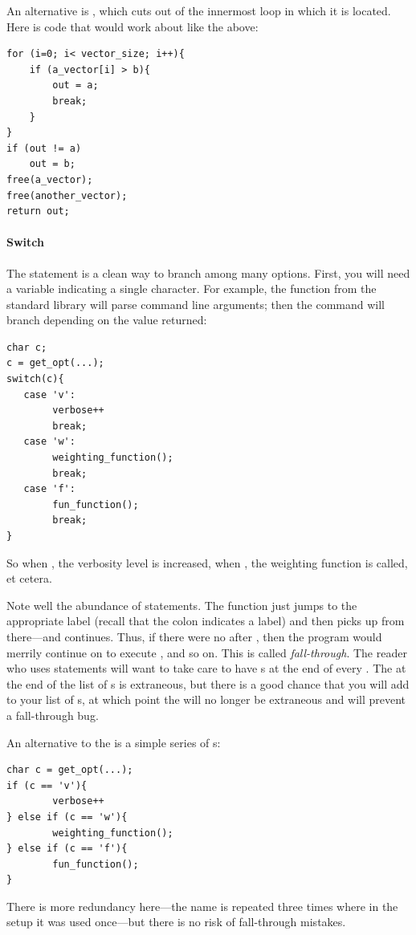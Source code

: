 \documentclass[12pt]{article}
\makeatletter
\def\cind#1{\index{#1@\cinline{#1}}\cinline{#1}}
\makeatother
\begin{document}
An alternative is \cind{break}, which cuts out of the innermost loop in
which it is located. Here is code that would work about like the above:
\begin{lstlisting}
for (i=0; i< vector_size; i++){
    if (a_vector[i] > b){
        out = a;
        break;
    }
}
if (out != a)
    out = b;
free(a_vector);
free(another_vector);
return out;
\end{lstlisting}

\paragraph{Switch} The \cind{switch} statement is a clean way to
branch among many options. First, you will need a variable indicating
a single character. For example, the  function from the
standard library will parse command line arguments; then the 
command will branch depending on the value returned:
\begin{lstlisting}
char c;
c = get_opt(...);
switch(c){
   case 'v':
        verbose++
        break;
   case 'w':    
        weighting_function();
        break;
   case 'f':      
        fun_function();
        break;
}
\end{lstlisting}
So when 
, the verbosity level is increased,
when , the weighting function is called, 
et cetera.

Note well the abundance of  statements.  The 
function just jumps to the appropriate label (recall that the colon
indicates a label) and then picks up from there---and continues. Thus,
if there were no  after , then the program
would merrily continue on to execute , and so
on. This is called {\sl fall-through}. The
reader who uses  statements will want to take care
to have s at the end of every .  The 
at the end of the list of s is extraneous, but there is a good
chance that you will add to your list of s, at which point
the  will no longer be extraneous and will prevent a fall-through bug.

An alternative to the  is a simple series of s:
\begin{lstlisting}
char c = get_opt(...);
if (c == 'v'){
        verbose++
} else if (c == 'w'){
        weighting_function();
} else if (c == 'f'){
        fun_function();
}
\end{lstlisting}
There is more redundancy here---the name  is repeated three times
where in the  setup it was used once---but there is no risk
of fall-through mistakes.
\end{document}

